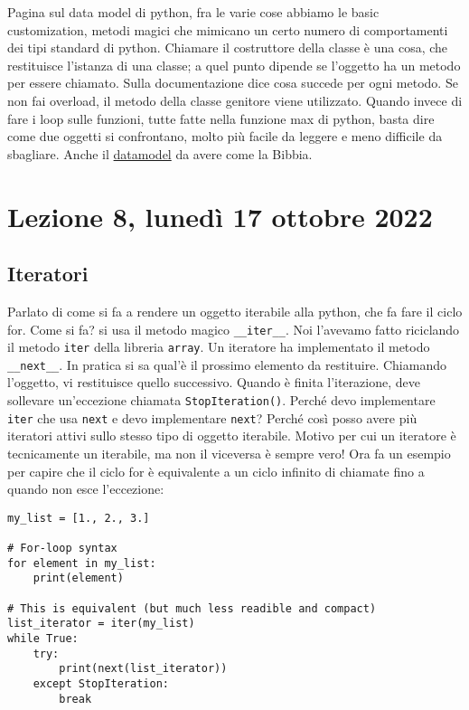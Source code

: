 \documentclass[10pt, a4paper, titlepage]{book}
\begin{document}
Pagina sul data model di python, fra le varie cose abbiamo le basic customization, metodi magici che mimicano un certo numero di comportamenti dei tipi standard di python.
Chiamare il costruttore della classe è una cosa, che restituisce l'istanza di una classe; a quel punto dipende se l'oggetto ha un metodo per essere chiamato.
Sulla documentazione dice cosa succede per ogni metodo. Se non fai overload, il metodo della classe genitore viene utilizzato.
Quando invece di fare i loop sulle funzioni, tutte fatte nella funzione max di python, basta dire come due oggetti si confrontano, molto più facile da leggere e meno difficile da sbagliare.
Anche il \href{https://docs.python.org/3/reference/datamodel.html}{datamodel} da avere come la Bibbia.

\section{Lezione 8, lunedì 17 ottobre 2022}

\subsection{Iteratori}

Parlato di come si fa a rendere un oggetto iterabile alla python, che fa fare il ciclo for. Come si fa? si usa il metodo magico \texttt{__iter__}. Noi l'avevamo fatto riciclando il metodo \texttt{iter} della libreria \texttt{array}.
Un iteratore ha implementato il metodo \texttt{__next__}. In pratica si sa qual'è il prossimo elemento da restituire. Chiamando l'oggetto, vi restituisce quello successivo. Quando è finita l'iterazione, deve sollevare un'eccezione chiamata \texttt{StopIteration()}.
Perché devo implementare \texttt{iter} che usa \texttt{next} e devo implementare \texttt{next}? Perché così posso avere più iteratori attivi sullo stesso tipo di oggetto iterabile.
Motivo per cui un iteratore è tecnicamente un iterabile, ma non il viceversa è sempre vero!
Ora fa un esempio per capire che il ciclo for è equivalente a un ciclo infinito di chiamate fino a quando non esce l'eccezione:

\begin{verbatim}
my_list = [1., 2., 3.]

# For-loop syntax
for element in my_list:
	print(element)

# This is equivalent (but much less readible and compact)
list_iterator = iter(my_list)
while True:
	try:
		print(next(list_iterator))
	except StopIteration:
		break
\end{verbatim}
\end{document}
